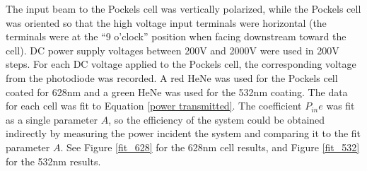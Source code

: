 The input beam to the Pockels cell was vertically polarized, while the Pockels cell was oriented so that the high voltage input terminals were horizontal (the terminals were at the ``9 o'clock'' position when facing downstream toward the cell). DC power supply voltages between 200V and 2000V were used in 200V steps. For each DC voltage applied to the Pockels cell, the corresponding voltage from the photodiode was recorded. A red HeNe was used for the Pockels cell coated for 628nm and a green HeNe was used for the 532nm coating. The data for each cell was fit to Equation \ref{power transmitted}. The coefficient $P_{in} e$ was fit as a single parameter $A$, so the efficiency of the system could be obtained indirectly by measuring the power incident the system and comparing it to the fit parameter $A$. See Figure \ref{fit_628} for the 628nm cell results, and Figure \ref{fit_532} for the 532nm results.

